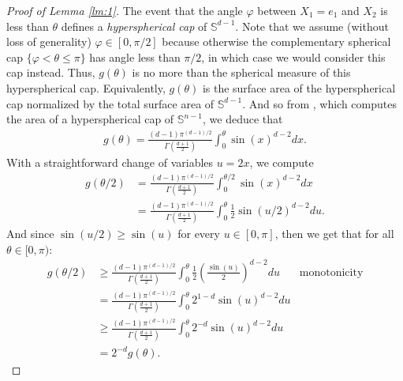 \documentclass{article}
\begin{document}
\begin{proof}[Proof of Lemma \ref{lm:1}]
The event that the angle $\varphi$ between $X_1 = e_1$ and $X_2$ is less than $\theta$ defines a \textit{hyperspherical cap} of $\mathbb{S}^{d-1}$. Note that we assume (without loss of generality) $\varphi \in [0, \pi/2]$ because otherwise the complementary spherical cap $\{ \varphi < \theta \leq \pi \}$ has angle less than $\pi/2$, in which case we would consider this cap instead. Thus, $g(\theta)$ is no more than the spherical measure of this hyperspherical cap. Equivalently, $g(\theta)$ is the surface area of the hyperspherical cap normalized by the total surface area of $\mathbb{S}^{d-1}$. And so from \cite{li2011hyper}, which computes the area of a hyperspherical cap of $\mathbb{S}^{n-1}$, we deduce that
\begin{align*}
    g(\theta) = \frac{(d-1) \pi^{(d-1)/2}}{\Gamma \left( \frac{d+1}{2} \right)} \int_0^{\theta} \sin(x)^{d-2} dx.
\end{align*}
With a straightforward change of variables $u = 2x$, we compute 
\begin{align*}
    g(\theta/2) &= \frac{(d-1) \pi^{(d-1)/2}}{\Gamma \left( \frac{d+1}{2} \right)} \int_0^{\theta/2} \sin(x)^{d-2} dx\\
     &= \frac{(d-1) \pi^{(d-1)/2}}{\Gamma \left( \frac{d+1}{2} \right)} \int_0^{\theta} \frac{1}{2} \sin(u/2)^{d-2} du.
\end{align*}
And since $\sin(u/2) \geq \sin(u)$ for every $u \in [0, \pi]$, then we get that for all $\theta \in [0, \pi)$:
\begin{align}
    g(\theta/2) &\geq \frac{(d-1) \pi^{(d-1)/2}}{\Gamma \left( \frac{d+1}{2} \right)} \int_0^{\theta} \frac{1}{2} \left( \frac{\sin(u)}{2} \right)^{d-2} du & \text{monotonicity} \nonumber\\
    &= \frac{(d-1) \pi^{(d-1)/2}}{\Gamma \left( \frac{d+1}{2} \right)} \int_0^{\theta} 2^{1-d} \sin(u)^{d-2} du \nonumber\\
    &\geq \frac{(d-1) \pi^{(d-1)/2}}{\Gamma \left( \frac{d+1}{2} \right)} \int_0^{\theta} 2^{-d} \sin(u)^{d-2} du \nonumber\\
    &= 2^{-d} g(\theta).\label{eq3}
\end{align}


\end{proof}
\end{document}
